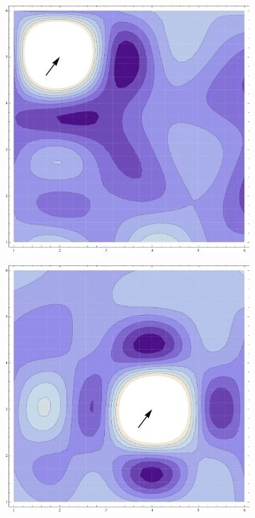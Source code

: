 \begin{figure}
\centering
\begin{subfigure}{.5\textwidth}
  \centering
  \includegraphics[scale=.35]{2-5.pdf}
\end{subfigure}%
\begin{subfigure}{.5\textwidth}
  \centering
  \includegraphics[scale=.35]{4-3.pdf}
\end{subfigure}
\label{fig:test2}
\end{figure}
